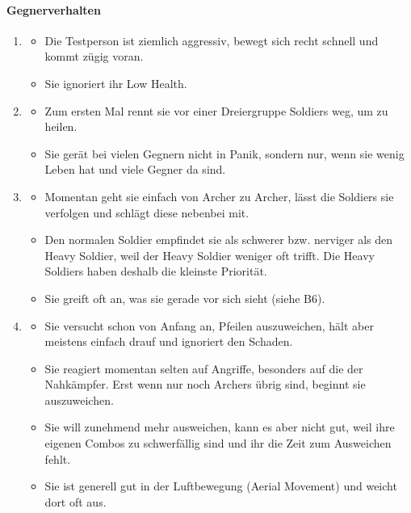 \documentclass[../Main.tex]{subfiles}
\begin{document}
\paragraph{Gegnerverhalten}
\begin{enumerate}[label=\textbf{B\arabic*}, leftmargin=1.5cm, itemsep=0.8em]
\item
    \begin{itemize}[nosep]
        \item Die Testperson ist ziemlich aggressiv, bewegt sich recht schnell und kommt zügig voran.
        \item Sie ignoriert ihr Low Health.
    \end{itemize}

\item
    \begin{itemize}[nosep]
        \item Zum ersten Mal rennt sie vor einer Dreiergruppe Soldiers weg, um zu heilen.
        \item Sie gerät bei vielen Gegnern nicht in Panik, sondern nur, wenn sie wenig Leben hat und viele Gegner da sind.
    \end{itemize}

\item
    \begin{itemize}[nosep]
        \item Momentan geht sie einfach von Archer zu Archer, lässt die Soldiers sie verfolgen und schlägt diese nebenbei mit.
        \item Den normalen Soldier empfindet sie als schwerer bzw. nerviger als den Heavy Soldier, weil der Heavy Soldier weniger oft trifft. Die Heavy Soldiers haben deshalb die kleinste Priorität.
        \item Sie greift oft an, was sie gerade vor sich sieht (siehe B6).
    \end{itemize}

\item
    \begin{itemize}[nosep]
        \item Sie versucht schon von Anfang an, Pfeilen auszuweichen, hält aber meistens einfach drauf und ignoriert den Schaden.
        \item Sie reagiert momentan selten auf Angriffe, besonders auf die der Nahkämpfer. Erst wenn nur noch Archers übrig sind, beginnt sie auszuweichen.
        \item Sie will zunehmend mehr ausweichen, kann es aber nicht gut, weil ihre eigenen Combos zu schwerfällig sind und ihr die Zeit zum Ausweichen fehlt.
        \item Sie ist generell gut in der Luftbewegung (Aerial Movement) und weicht dort oft aus.
    \end{itemize}


\end{enumerate}
\end{document}

